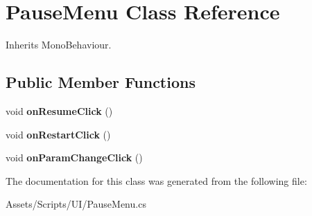 \hypertarget{class_pause_menu}{\section{Pause\-Menu Class Reference}
\label{class_pause_menu}
}


Inherits Mono\-Behaviour.

\subsection*{Public Member Functions}
\begin{DoxyCompactItemize}
\item 
\hypertarget{class_pause_menu_a2c38b4232d7553a3ad654dfaefe4d894}{void {\bfseries on\-Resume\-Click} ()}\label{class_pause_menu_a2c38b4232d7553a3ad654dfaefe4d894}

\item 
\hypertarget{class_pause_menu_aec118e24c6ddd93cb9d6527fced3452d}{void {\bfseries on\-Restart\-Click} ()}\label{class_pause_menu_aec118e24c6ddd93cb9d6527fced3452d}

\item 
\hypertarget{class_pause_menu_a6d041596ed5d271f1fbfbfe3979923fc}{void {\bfseries on\-Param\-Change\-Click} ()}\label{class_pause_menu_a6d041596ed5d271f1fbfbfe3979923fc}

\end{DoxyCompactItemize}


The documentation for this class was generated from the following file\-:\begin{DoxyCompactItemize}
\item 
Assets/\-Scripts/\-U\-I/Pause\-Menu.\-cs\end{DoxyCompactItemize}
